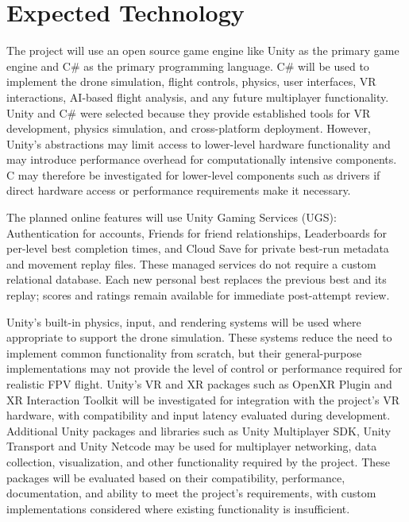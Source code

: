\documentclass{article}
\begin{document}
\section{Expected Technology}


\noindent The project will use an open source game engine like Unity as the primary game engine and C\# as the primary programming language. C\# will be used to implement the drone simulation, flight controls, physics, user interfaces, VR interactions, AI-based flight analysis, and any future multiplayer functionality. Unity and C\# were selected because they provide established tools for VR development, physics simulation, and cross-platform deployment. However, Unity's abstractions may limit access to lower-level hardware functionality and may introduce performance overhead for computationally intensive components. C may therefore be investigated for lower-level components such as drivers if direct hardware access or performance requirements make it necessary.

The planned online features will use Unity Gaming Services (UGS): Authentication
for accounts, Friends for friend relationships, Leaderboards for per-level best
completion times, and Cloud Save for private best-run metadata and movement
replay files. These managed services do not require a custom relational database.
Each new personal best replaces the previous best and its replay; scores and
ratings remain available for immediate post-attempt review.

\vspace{0.75em}

\noindent Unity's built-in physics, input, and rendering systems will be used where appropriate to support the drone simulation. These systems reduce the need to implement common functionality from scratch, but their general-purpose implementations may not provide the level of control or performance required for realistic FPV flight. Unity's VR and XR packages such as OpenXR Plugin and XR Interaction Toolkit will be investigated for integration with the project's VR hardware, with compatibility and input latency evaluated during development. Additional Unity packages and libraries such as Unity Multiplayer SDK, Unity Transport and Unity Netcode may be used for multiplayer networking, data collection, visualization, and other functionality required by the project. These packages will be evaluated based on their compatibility, performance, documentation, and ability to meet the project's requirements, with custom implementations considered where existing functionality is insufficient.
\end{document}
